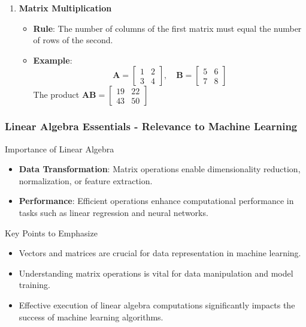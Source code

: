\documentclass{beamer}
\begin{document}
\begin{frame}[fragile]
\begin{enumerate}
        \item \textbf{Matrix Multiplication}
        \begin{itemize}
            \item \textbf{Rule}: The number of columns of the first matrix must equal the number of rows of the second.
            \item \textbf{Example}: 
            \[
            \mathbf{A} = 
            \begin{bmatrix}
            1 & 2 \\
            3 & 4
            \end{bmatrix}
            , \quad 
            \mathbf{B} = 
            \begin{bmatrix}
            5 & 6 \\
            7 & 8
            \end{bmatrix}
            \]
            The product $\mathbf{AB} = 
            \begin{bmatrix}
            19 & 22 \\
            43 & 50
            \end{bmatrix}
            $
        \end{itemize}
    \end{enumerate}
\end{frame}

\begin{frame}[fragile]
    \frametitle{Linear Algebra Essentials - Relevance to Machine Learning}
    \begin{block}{Importance of Linear Algebra}
        \begin{itemize}
            \item \textbf{Data Transformation}: Matrix operations enable dimensionality reduction, normalization, or feature extraction.
            \item \textbf{Performance}: Efficient operations enhance computational performance in tasks such as linear regression and neural networks.
        \end{itemize}
    \end{block}

    \begin{block}{Key Points to Emphasize}
        \begin{itemize}
            \item Vectors and matrices are crucial for data representation in machine learning.
            \item Understanding matrix operations is vital for data manipulation and model training.
            \item Effective execution of linear algebra computations significantly impacts the success of machine learning algorithms.
        \end{itemize}
    \end{block}
\end{frame}
\end{document}
